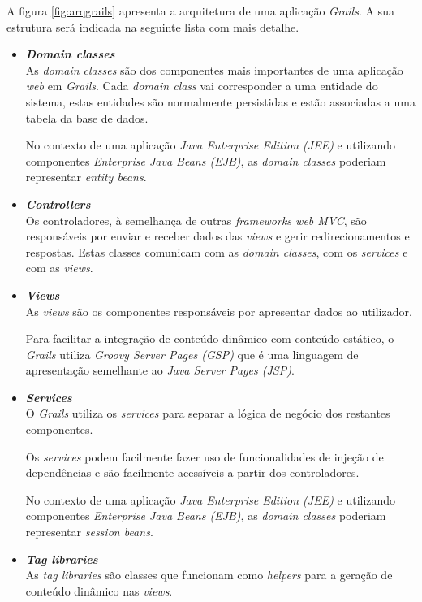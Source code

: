 \hspace{1cm}

A figura \ref{fig:arqgrails} apresenta a arquitetura de uma aplicação \textit{Grails}. A sua estrutura será indicada na seguinte lista com mais detalhe.

\begin{itemize}
    \item \textbf{\textit{Domain classes}}\\

    As \textit{domain classes} são dos componentes mais importantes de uma aplicação \textit{web} em \textit{Grails}. Cada \textit{domain class} vai corresponder a uma entidade do sistema, estas entidades são normalmente persistidas e estão associadas a uma tabela da base de dados.

    No contexto de uma aplicação \textit{Java Enterprise Edition (JEE)} e utilizando componentes \textit{Enterprise Java Beans (EJB)}, as \textit{domain classes} poderiam representar \textit{entity beans}.

    \item \textbf{\textit{Controllers}}\\

    Os controladores, à semelhança de outras \textit{frameworks web MVC}, são responsáveis por enviar e receber dados das \textit{views} e gerir redirecionamentos e respostas. Estas classes comunicam com as \textit{domain classes}, com os \textit{services} e com as \textit{views}.

    \item \textbf{\textit{Views}}\\

    As \textit{views} são os componentes responsáveis por apresentar dados ao utilizador.

    Para facilitar a integração de conteúdo dinâmico com conteúdo estático, o \textit{Grails} utiliza \textit{Groovy Server Pages (GSP)} que é uma linguagem de apresentação semelhante ao \textit{Java Server Pages (JSP)}.

    \item \textbf{\textit{Services}}\\

    O \textit{Grails} utiliza os \textit{services} para separar a lógica de negócio dos restantes componentes.

    Os \textit{services} podem facilmente fazer uso de funcionalidades de injeção de dependências e são facilmente acessíveis a partir dos controladores.

    No contexto de uma aplicação \textit{Java Enterprise Edition (JEE)} e utilizando componentes \textit{Enterprise Java Beans (EJB)}, as \textit{domain classes} poderiam representar \textit{session beans}.

    \item \textbf{\textit{Tag libraries}}\\

    As \textit{tag libraries} são classes que funcionam como \textit{helpers} para a geração de conteúdo dinâmico nas \textit{views}.

\end{itemize}

